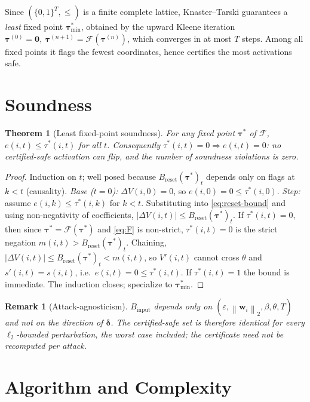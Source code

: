 \documentclass[10pt,twocolumn]{article}
\newtheorem{theorem}{Theorem}
\newtheorem{remark}{Remark}
\newcommand{\norm}[1]{\left\lVert #1 \right\rVert}
\newcommand{\abs}[1]{\left\lvert #1 \right\rvert}
\newcommand{\eps}{\varepsilon}
\newcommand{\F}{\mathcal{F}}
\newcommand{\Bin}{B_{\mathrm{input}}}
\newcommand{\Brst}{B_{\mathrm{reset}}}
\begin{document}
Since $(\{0,1\}^T,\le)$ is a finite complete lattice, Knaster--Tarski \citep{tarski1955lattice}
guarantees a \emph{least} fixed point $\bm{\tau}^{*}_{\min}$, obtained by the upward Kleene
iteration $\bm{\tau}^{(0)}=\bm0,\ \bm{\tau}^{(n+1)}=\F(\bm{\tau}^{(n)})$, which converges in at
most $T$ steps. Among all fixed points it flags the fewest coordinates, hence certifies the
most activations safe.

\section{Soundness}
\label{sec:sound}

\begin{theorem}[Least fixed-point soundness]\label{thm:sound}
For any fixed point $\bm{\tau}^{*}$ of $\F$, $e(i,t)\le\tau^{*}(i,t)$ for all $t$.
Consequently $\tau^{*}(i,t)=0\Rightarrow e(i,t)=0$: no certified-safe activation can flip, and
the number of soundness violations is zero.
\end{theorem}
\begin{proof}
Induction on $t$; well posed because $\Brst(\bm{\tau}^{*})_t$ depends only on flags at $k<t$
(causality). \emph{Base ($t=0$):} $\Delta V(i,0)=0$, so $e(i,0)=0\le\tau^{*}(i,0)$.
\emph{Step:} assume $e(i,k)\le\tau^{*}(i,k)$ for $k<t$. Substituting into
\eqref{eq:reset-bound} and using non-negativity of coefficients,
$\abs{\Delta V(i,t)}\le \Brst(\bm{\tau}^{*})_t$. If $\tau^{*}(i,t)=0$, then since
$\bm{\tau}^{*}=\F(\bm{\tau}^{*})$ and \eqref{eq:F} is non-strict, $\tau^{*}(i,t)=0$ is the
strict negation $m(i,t)>\Brst(\bm{\tau}^{*})_t$. Chaining,
$\abs{\Delta V(i,t)}\le\Brst(\bm{\tau}^{*})_t<m(i,t)$, so $V'(i,t)$ cannot cross $\theta$ and
$s'(i,t)=s(i,t)$, i.e.\ $e(i,t)=0\le\tau^{*}(i,t)$. If $\tau^{*}(i,t)=1$ the bound is
immediate. The induction closes; specialize to $\bm{\tau}^{*}_{\min}$.
\end{proof}

\begin{remark}[Attack-agnosticism]\label{rem:agnostic}
$\Bin$ depends only on $(\eps,\norm{\bm{w}_i}_2,\beta,\theta,T)$ and not on the direction of
$\bm{\delta}$. The certified-safe set is therefore identical for every $\ell_2$-bounded
perturbation, the worst case included; the certificate need not be recomputed per attack.
\end{remark}

\section{Algorithm and Complexity}
\label{sec:algo}
\end{document}
